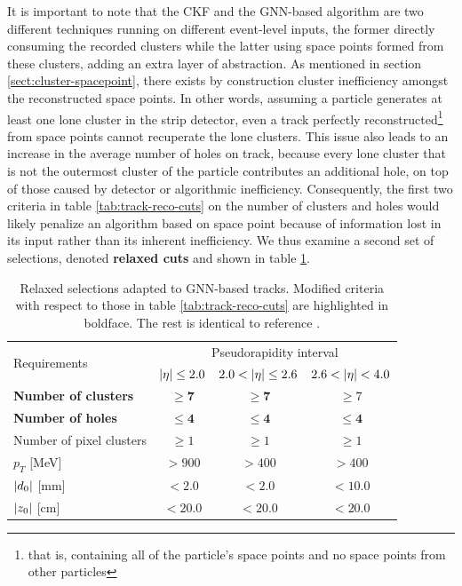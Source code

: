 It is important to note that the CKF and the GNN-based algorithm are two different techniques running on different event-level inputs, the former directly consuming the recorded clusters while the latter using space points formed from these clusters, adding an extra layer of abstraction. 
As mentioned in section \ref{sect:cluster-spacepoint}, there exists by construction cluster inefficiency amongst the reconstructed space points. 
In other words, assuming a particle generates at least one lone cluster in the strip detector, even a track perfectly reconstructed\footnote{that is, containing all of the particle's space points and no space points from other particles} from space points cannot recuperate the lone clusters. 
This issue also leads to an increase in the average number of holes on track, because every lone cluster that is not the outermost cluster of the particle contributes an additional hole, on top of those caused by detector or algorithmic inefficiency. 
Consequently, the first two criteria in table \ref{tab:track-reco-cuts} on the number of clusters and holes would likely penalize an algorithm based on space point because of information lost in its input rather than its inherent inefficiency. 
We thus examine a second set of selections, denoted \textbf{relaxed cuts} and shown in table \ref{tab:track-reco-cuts-relaxed}.
\begin{table}[h!]
    \centering
    \begin{tabular}{|l|c|c|c|} \hline
       \multirow{2}{*}{Requirements}  & \multicolumn{3}{c|}{Pseudorapidity interval} \\ \cline{2-4}
         & $\abs{\eta} \le 2.0 $ & $2.0< \abs{\eta} \le 2.6$ & $2.6 < \abs{\eta} < 4.0 $ \\ \hline
         \textbf{Number of clusters} & $\ge \mathbf{7}$ & $\ge \mathbf{7}$ & $\ge 7$ \\
         \textbf{Number of holes} & $\le \mathbf{4}$ & $\le \mathbf{4}$ & $\le \mathbf{4} $ \\
         Number of pixel clusters & $\ge 1$ & $\ge 1$ & $\ge 1$ \\
         $p_T$ [MeV] & $> 900$ & $>400$ & $>400$ \\
         $\abs{d_0}$ [mm] & $< 2.0$ & $<2.0$ & $<10.0$ \\
         $\abs{z_0}$ [cm] & $< 20.0$ & $<20.0$ & $<20.0$ \\
         \hline     
    \end{tabular}
    \caption{Relaxed selections adapted to GNN-based tracks. Modified criteria with respect to those in table \ref{tab:track-reco-cuts} are highlighted in boldface. The rest is identical to reference \cite{Aad_2025}.}
    \label{tab:track-reco-cuts-relaxed}
\end{table}
